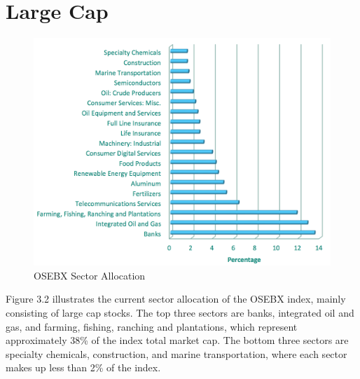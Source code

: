 \section{Large Cap}
\begin{figure}[H]
\centering
\includegraphics [scale=0.44,angle=360]{figures/largesector.png}
\caption{OSEBX Sector Allocation \cite{bors}}
\label{fig:largesector}
\end{figure}
\indent\newline 
Figure 3.2 illustrates the current sector allocation of the OSEBX index, mainly consisting of large cap stocks. The top three sectors are banks, integrated oil and gas, and farming, fishing, ranching and plantations, which represent approximately 38\% of the index total market cap. The bottom three sectors are specialty chemicals, construction, and marine transportation, where each sector makes up less than 2\% of the index. 

\indent\newline 
\begin{table}[ht]
\centering
{}
\caption{Large cap summary statistics}
\end{table} 
